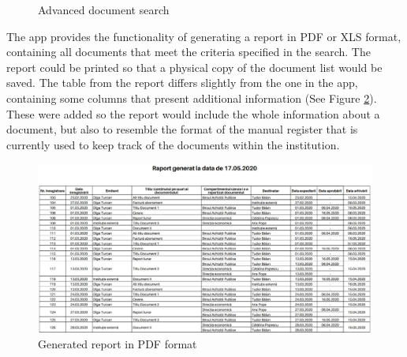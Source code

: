 \begin{figure}[ht]
    \centering
    \qquad
    \caption{Advanced document search}
    \label{advancedSearch}
\end{figure}

The app provides the functionality of generating a report in PDF or XLS format, containing all documents that meet the criteria specified in the search. The report could be printed so that a physical copy of the document list would be saved. The table from the report differs slightly from the one in the app, containing some columns that present additional information (See Figure \ref{pdfReport}). These were added so the report would include the whole information about a document, but also to resemble the format of the manual register that is currently used to keep track of the documents within the institution.

\begin{figure}[H]
    \centering
    \includegraphics[width=5.5in]{images/app/report_pdf}
    \caption{Generated report in PDF format}
    \label{pdfReport}
\end{figure}

